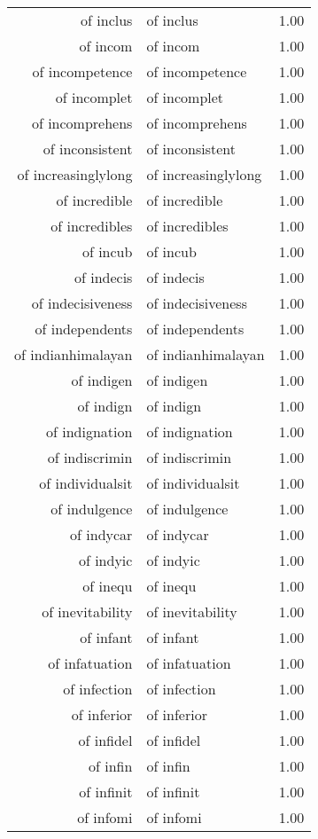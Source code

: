 \begin{table}[ht]
\begin{tabular}{rlr}
  of inclus & of inclus & 1.00 \\ 
  of incom & of incom & 1.00 \\ 
  of incompetence & of incompetence & 1.00 \\ 
  of incomplet & of incomplet & 1.00 \\ 
  of incomprehens & of incomprehens & 1.00 \\ 
  of inconsistent & of inconsistent & 1.00 \\ 
  of increasinglylong & of increasinglylong & 1.00 \\ 
  of incredible & of incredible & 1.00 \\ 
  of incredibles & of incredibles & 1.00 \\ 
  of incub & of incub & 1.00 \\ 
  of indecis & of indecis & 1.00 \\ 
  of indecisiveness & of indecisiveness & 1.00 \\ 
  of independents & of independents & 1.00 \\ 
  of indianhimalayan & of indianhimalayan & 1.00 \\ 
  of indigen & of indigen & 1.00 \\ 
  of indign & of indign & 1.00 \\ 
  of indignation & of indignation & 1.00 \\ 
  of indiscrimin & of indiscrimin & 1.00 \\ 
  of individualsit & of individualsit & 1.00 \\ 
  of indulgence & of indulgence & 1.00 \\ 
  of indycar & of indycar & 1.00 \\ 
  of indyic & of indyic & 1.00 \\ 
  of inequ & of inequ & 1.00 \\ 
  of inevitability & of inevitability & 1.00 \\ 
  of infant & of infant & 1.00 \\ 
  of infatuation & of infatuation & 1.00 \\ 
  of infection & of infection & 1.00 \\ 
  of inferior & of inferior & 1.00 \\ 
  of infidel & of infidel & 1.00 \\ 
  of infin & of infin & 1.00 \\ 
  of infinit & of infinit & 1.00 \\ 
  of infomi & of infomi & 1.00 \\ 

\end{tabular}
\end{table}
